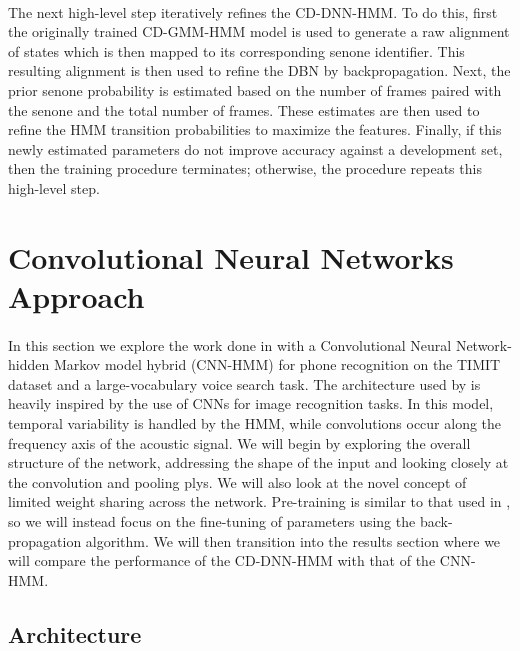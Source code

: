 \documentclass[letterpaper]{article}
\begin{document}
\paragraph{} The next high-level step iteratively refines the CD-DNN-HMM. To do this, first the originally trained CD-GMM-HMM model is used to generate a raw alignment of states which is then mapped to its corresponding senone identifier. This resulting alignment is then used to refine the DBN by backpropagation. Next, the prior senone probability is estimated based on the number of frames paired with the senone and the total number of frames. These estimates are then used to refine the HMM transition probabilities to maximize the features. Finally, if this newly estimated parameters do not improve accuracy against a development set, then the training procedure terminates; otherwise, the procedure repeats this high-level step.

\section*{Convolutional Neural Networks Approach}

\paragraph{} In this section we explore the work done in \cite{DBLP:journals/taslp/Abdel-HamidMJDPY14} with a Convolutional Neural Network-hidden Markov model hybrid (CNN-HMM) for phone recognition on the TIMIT dataset and a large-vocabulary voice search task. The architecture used by \cite{DBLP:journals/taslp/Abdel-HamidMJDPY14} is heavily inspired by the use of CNNs for image recognition tasks. In this model, temporal variability is handled by the HMM, while convolutions occur along the frequency axis of the acoustic signal. We will begin by exploring the overall structure of the network, addressing the shape of the input and looking closely at the convolution and pooling plys. We will also look at the novel concept of limited weight sharing across the network. Pre-training is similar to that used in \cite{DBLP:journals/taslp/DahlYDA12}, so we will instead focus on the fine-tuning of parameters using the back-propagation algorithm. We will then transition into the results section where we will compare the performance of the CD-DNN-HMM with that of the CNN-HMM.

\subsection*{Architecture}
\end{document}
